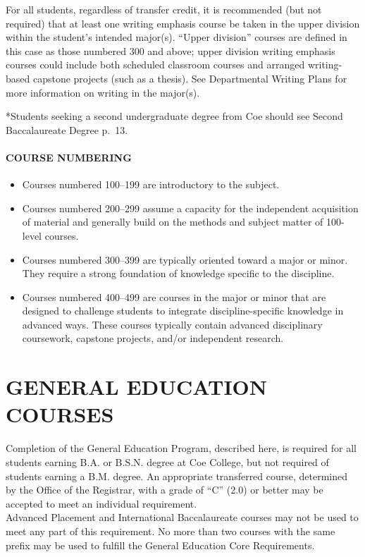 \documentclass[
  letterpaper,
]{scrbook}
\providecommand{\tightlist}{%
  \setlength{\itemsep}{0pt}\setlength{\parskip}{0pt}}
\begin{document}
For all students, regardless of transfer credit, it is recommended (but
not required) that at least one writing emphasis course be taken in the
upper division within the student's intended major(s). ``Upper
division'' courses are defined in this case as those numbered 300 and
above; upper division writing emphasis courses could include both
scheduled classroom courses and arranged writing-based capstone projects
(such as a thesis). See Departmental Writing Plans for more information
on writing in the major(s).

*Students seeking a second undergraduate degree from Coe should see
Second Baccalaureate Degree p.~13.

\subsubsection{COURSE NUMBERING}\label{course-numbering}

\begin{itemize}
\tightlist
\item
  Courses numbered 100--199 are introductory to the subject.
\item
  Courses numbered 200--299 assume a capacity for the independent
  acquisition of material and generally build on the methods and subject
  matter of 100-level courses.
\item
  Courses numbered 300--399 are typically oriented toward a major or
  minor. They require a strong foundation of knowledge specific to the
  discipline.
\item
  Courses numbered 400--499 are courses in the major or minor that are
  designed to challenge students to integrate discipline-specific
  knowledge in advanced ways. These courses typically contain advanced
  disciplinary coursework, capstone projects, and/or independent
  research.
\end{itemize}

\chapter{GENERAL EDUCATION COURSES}\label{sec-general-education-courses}

Completion of the General Education Program, described here, is required
for all students earning B.A. or B.S.N. degree at Coe College, but not
required of students earning a B.M. degree. An appropriate transferred
course, determined by the Office of the Registrar, with a grade of ``C''
(2.0) or better may be accepted to meet an individual requirement.\\
Advanced Placement and International Baccalaureate courses may not be
used to meet any part of this requirement. No more than two courses with
the same prefix may be used to fulfill the General Education Core
Requirements.
\end{document}
